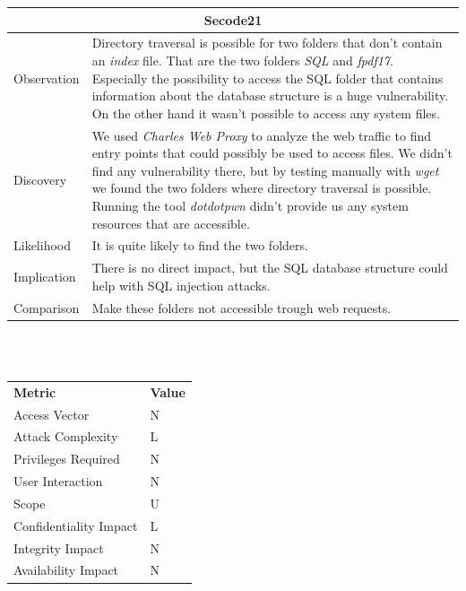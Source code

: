 \documentclass[headsepline,footsepline,footinclude=false,oneside,fontsize=11pt,paper=a4,listof=totoc,bibliography=totoc]{scrbook} %
\begin{document}
\begin{tabular}{ l|p{11cm}  }
	\hline
	\multicolumn{2}{c}{\textbf{Secode21}} \\
	\hline
	Observation   & Directory traversal is possible for two folders that don't contain an \textit{index} file. That are the two folders \textit{SQL} and \textit{fpdf17}. Especially the possibility to access the SQL folder that contains information about the database structure is a huge vulnerability. On the other hand it wasn't possible to access any system files. \\
	Discovery  & We used \textit{Charles Web Proxy} to analyze the web traffic to find entry points that could possibly be used to access files. We didn't find any vulnerability there, but by testing manually with \textit{wget} we found the two folders where directory traversal is possible. Running the tool \textit{dotdotpwn} didn't provide us any system resources that are accessible. \\
	Likelihood & It is quite likely to find the two folders. \\
	Implication    & There is no direct impact, but the SQL database structure could help with SQL injection attacks. \\
	Comparison & Make these folders not accessible trough web requests.  \\
	\hline
\end{tabular}
\\
\vspace{0.5cm}
\\
\begin{center}
	\begin{tabular}{ll}
		\rowcolor[HTML]{34CDF9}
		{\color[HTML]{ECF4FF} \textbf{Metric}}        & {\color[HTML]{ECF4FF} \textbf{Value}} \\
		\rowcolor[HTML]{BBDAFF}
		{\color[HTML]{333333} Access Vector}          & {\color[HTML]{333333} } N              \\
		\rowcolor[HTML]{ECF4FF}
		{\color[HTML]{333333} Attack Complexity}      & {\color[HTML]{333333} } L              \\
		\rowcolor[HTML]{BBDAFF}
		{\color[HTML]{333333} Privileges Required}    & {\color[HTML]{333333} } N              \\
		\rowcolor[HTML]{ECF4FF}
		{\color[HTML]{333333} User Interaction}       & {\color[HTML]{333333} } N              \\
		\rowcolor[HTML]{BBDAFF}
		{\color[HTML]{333333} Scope}                  & {\color[HTML]{333333} } U              \\
		\rowcolor[HTML]{ECF4FF}
		{\color[HTML]{333333} Confidentiality Impact} & {\color[HTML]{333333} } L              \\
		\rowcolor[HTML]{BBDAFF}
		{\color[HTML]{333333} Integrity Impact}       & {\color[HTML]{333333} } N              \\
		\rowcolor[HTML]{ECF4FF}
		{\color[HTML]{333333} Availability Impact}    & {\color[HTML]{333333} } N
	\end{tabular}
\end{center}
\pagebreak
\end{document}
